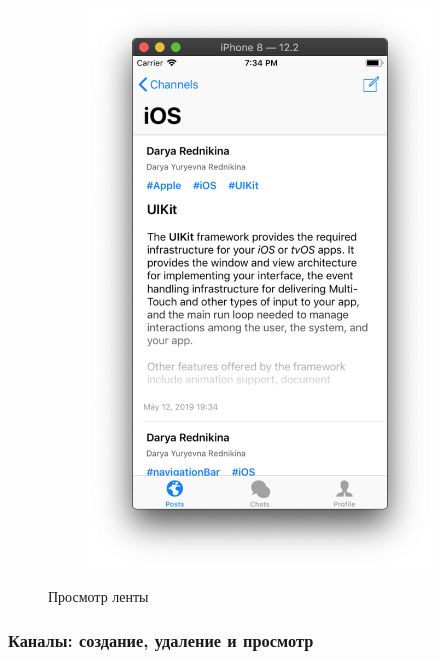 \documentclass[a4paper,12pt]{article}
\begin{document}
\begin{figure}[h!]
\begin{subfigure}[b]{0.3\linewidth}
			\includegraphics[width=\linewidth]{../includes/pmi/ios_channel.png}
		\end{subfigure}
		\caption{\label{pic: newss}Просмотр ленты}
	\end{figure}
	\clearpage
	\subsubsection{Каналы: создание, удаление и просмотр}
\end{document}
